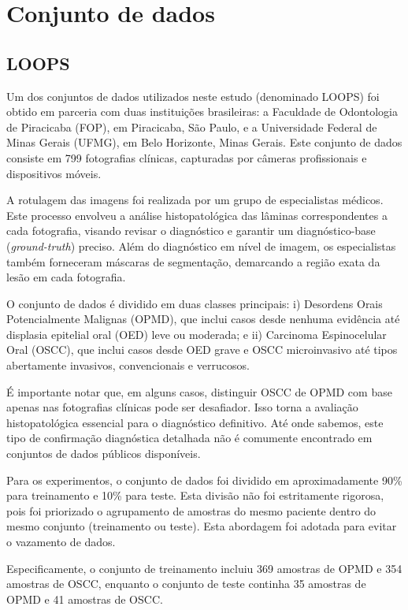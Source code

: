 \section{Conjunto de dados}

\subsection{LOOPS}

Um dos conjuntos de dados utilizados neste estudo (denominado LOOPS) foi obtido em parceria com duas instituições brasileiras: a Faculdade de Odontologia de Piracicaba (FOP), em Piracicaba, São Paulo, e a Universidade Federal de Minas Gerais (UFMG), em Belo Horizonte, Minas Gerais. Este conjunto de dados consiste em 799 fotografias clínicas, capturadas por câmeras profissionais e dispositivos móveis.

A rotulagem das imagens foi realizada por um grupo de especialistas médicos. Este processo envolveu a análise histopatológica das lâminas correspondentes a cada fotografia, visando revisar o diagnóstico e garantir um diagnóstico-base (\textit{ground-truth}) preciso. Além do diagnóstico em nível de imagem, os especialistas também forneceram máscaras de segmentação, demarcando a região exata da lesão em cada fotografia.

O conjunto de dados é dividido em duas classes principais: 
i) Desordens Orais Potencialmente Malignas (OPMD), que inclui casos desde nenhuma evidência até displasia epitelial oral (OED) leve ou moderada; e 
ii) Carcinoma Espinocelular Oral (OSCC), que inclui casos desde OED grave e OSCC microinvasivo até tipos abertamente invasivos, convencionais e verrucosos.

É importante notar que, em alguns casos, distinguir OSCC de OPMD com base apenas nas fotografias clínicas pode ser desafiador. Isso torna a avaliação histopatológica essencial para o diagnóstico definitivo. Até onde sabemos, este tipo de confirmação diagnóstica detalhada não é comumente encontrado em conjuntos de dados públicos disponíveis.

Para os experimentos, o conjunto de dados foi dividido em aproximadamente 90\% para treinamento e 10\% para teste. Esta divisão não foi estritamente rigorosa, pois foi priorizado o agrupamento de amostras do mesmo paciente dentro do mesmo conjunto (treinamento ou teste). Esta abordagem foi adotada para evitar o vazamento de dados.

Especificamente, o conjunto de treinamento incluiu 369 amostras de OPMD e 354 amostras de OSCC, enquanto o conjunto de teste continha 35 amostras de OPMD e 41 amostras de OSCC.

